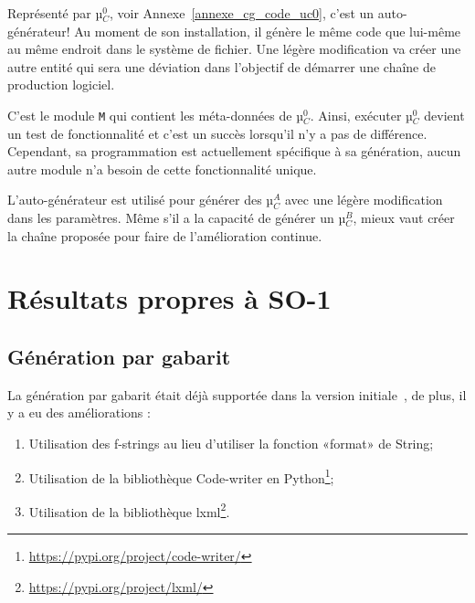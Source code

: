 Représenté par µ$_C^0$, voir Annexe~\ref{annexe_cg_code_uc0}, c’est un auto-générateur! Au moment de son installation, il génère le même code que lui-même au même endroit dans le système de fichier. Une légère modification va créer une autre entité qui sera une déviation dans l’objectif de démarrer une chaîne de production logiciel.

C'est le module \texttt{M} qui contient les méta-données de µ$_C^0$. Ainsi, exécuter µ$_C^0$ devient un test de fonctionnalité et c'est un succès lorsqu'il n'y a pas de différence. Cependant, sa programmation est actuellement spécifique à sa génération, aucun autre module n’a besoin de cette fonctionnalité unique.




L'auto-générateur est utilisé pour générer des µ$_C^A$ avec une légère modification dans les paramètres. Même s'il a la capacité de générer un µ$_C^B$, mieux vaut créer la chaîne proposée pour faire de l'amélioration continue.

\section{Résultats propres à SO-1}

\subsection{Génération par gabarit}

La génération par gabarit était déjà supportée dans la version initiale~\cite{bluiksnot_repo}, de plus, il y a eu des améliorations :
\begin{enumerate}
    \item Utilisation des f-strings au lieu d'utiliser la fonction «format» de String;
    \item Utilisation de la bibliothèque Code-writer en Python\footnote{\url{https://pypi.org/project/code-writer/}};
    \item Utilisation de la bibliothèque lxml\footnote{\url{https://pypi.org/project/lxml/}}.
\end{enumerate}

